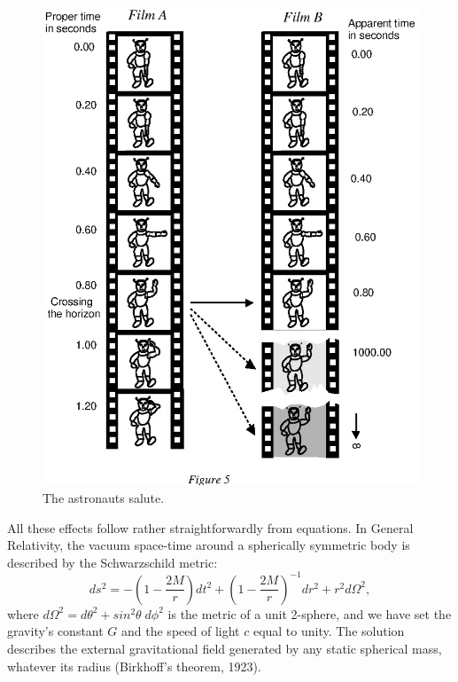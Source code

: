 \documentclass[12pt]{article}
\begin{document}
\begin{figure}[tb]
  \begin{center}
    \leavevmode
    \includegraphics{spaceship.ps}
    \caption{The astronauts salute.}
  \end{center}
\end{figure}

All these effects follow rather straightforwardly from equations.
In General Relativity, the vacuum space-time around a spherically symmetric body
is described by the Schwarzschild metric: 
\begin{equation}
ds^2 = - \left(1- \frac{2M}{r}\right)dt^2 
+ \left(1-\frac{2M}{r}\right)^{-1}dr^2 + r^2 d\Omega^2,
\end{equation}
where $d\Omega^2 = d\theta^2 + sin^2\theta \;d\phi^2$ is the metric of a unit
2-sphere, and we have set the gravity's constant $G$ and the speed of light $c$
equal to unity. The solution describes the external gravitational field
generated by any static spherical mass, whatever its radius (Birkhoff's theorem,
1923). 
\end{document}
